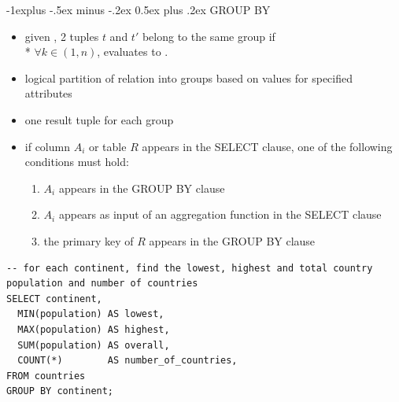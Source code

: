 \documentclass[10pt, landscape]{article}
\makeatletter
\renewcommand{\subsection}{\@startsection{subsection}{2}{0mm}%
  {-1explus -.5ex minus -.2ex}%
  {0.5ex plus .2ex}%
{\normalfont\normalsize\bfseries}}
\makeatother
\begin{document}
\begin{multicols}{3}
  \subsection{GROUP BY}
  \begin{itemize}
    \item given , 2 tuples $t$ and $t'$ belong to the same group if 
      \\* $\forall k \in (1, n)$,   evaluates to .
    \item logical partition of relation into groups based on values for specified attributes
    \item one result tuple for each group
    \item if column $A_i$ or table $R$ appears in the SELECT clause, one of the following conditions must hold:
      \begin{enumerate}
        \item $A_i$ appears in the GROUP BY clause
        \item $A_i$ appears as input of an aggregation function in the SELECT clause
        \item the primary key of $R$ appears in the GROUP BY clause
      \end{enumerate}
  \end{itemize}
  \begin{lstlisting}[style=mySQL]
-- for each continent, find the lowest, highest and total country population and number of countries
SELECT continent,
  MIN(population) AS lowest,
  MAX(population) AS highest,
  SUM(population) AS overall,
  COUNT(*)        AS number_of_countries,
FROM countries
GROUP BY continent;
  \end{lstlisting}


\end{multicols}
\end{document}
